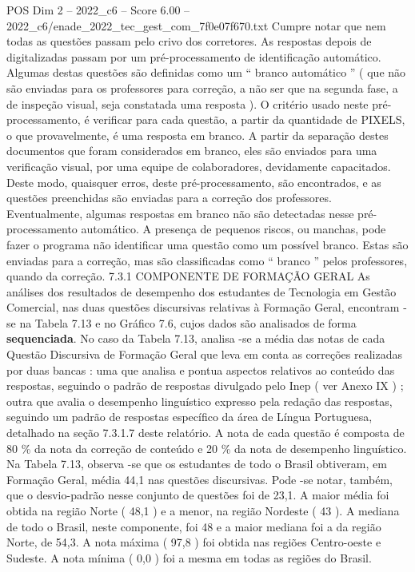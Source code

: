\begin{textsample}{POS Dim 2 – 2022\_c6 – Score 6.00 – 2022\_c6/enade\_2022\_tec\_gest\_com\_7f0e07f670.txt}
Cumpre notar que nem todas as questões passam pelo crivo dos corretores.
As respostas depois de digitalizadas passam por um pré-processamento de identificação automático.
Algumas destas questões são definidas como um “ branco automático ” ( que não são enviadas para os professores para correção, a não ser que na segunda fase, a de inspeção visual, seja constatada uma resposta ).
O critério usado neste pré-processamento, é verificar para cada questão, a partir da quantidade de PIXELS, o que provavelmente, é uma resposta em branco.
A partir da separação destes documentos que foram considerados em branco, eles são enviados para uma verificação visual, por uma equipe de colaboradores, devidamente capacitados.
Deste modo, quaisquer erros, deste pré-processamento, são encontrados, e as questões preenchidas são enviadas para a correção dos professores.
Eventualmente, algumas respostas em branco não são detectadas nesse pré-processamento automático.
A presença de pequenos riscos, ou manchas, pode fazer o programa não identificar uma questão como um possível branco.
Estas são enviadas para a correção, mas são classificadas como “ branco ” pelos professores, quando da correção. 7.3.1 COMPONENTE DE FORMAÇÃO GERAL As análises dos resultados de desempenho dos estudantes de Tecnologia em Gestão Comercial, nas duas questões discursivas relativas à Formação Geral, encontram -se na Tabela 7.13 e no Gráfico 7.6, cujos dados são analisados de forma \textbf{sequenciada}.
No caso da Tabela 7.13, analisa -se a média das notas de cada Questão Discursiva de Formação Geral que leva em conta as correções realizadas por duas bancas : uma que analisa e pontua aspectos relativos ao conteúdo das respostas, seguindo o padrão de respostas divulgado pelo Inep ( ver Anexo IX ) ; outra que avalia o desempenho linguístico expresso pela redação das respostas, seguindo um padrão de respostas específico da área de Língua Portuguesa, detalhado na seção 7.3.1.7 deste relatório.
A nota de cada questão é composta de 80 \% da nota da correção de conteúdo e 20 \% da nota de desempenho linguístico.
Na Tabela 7.13, observa -se que os estudantes de todo o Brasil obtiveram, em Formação Geral, média 44,1 nas questões discursivas.
Pode -se notar, também, que o desvio-padrão nesse conjunto de questões foi de 23,1.
A maior média foi obtida na região Norte ( 48,1 ) e a menor, na região Nordeste ( 43 ).
A mediana de todo o Brasil, neste componente, foi 48 e a maior mediana foi a da região Norte, de 54,3.
A nota máxima ( 97,8 ) foi obtida nas regiões Centro-oeste e Sudeste.
A nota mínima ( 0,0 ) foi a mesma em todas as regiões do Brasil.

\end{textsample}
